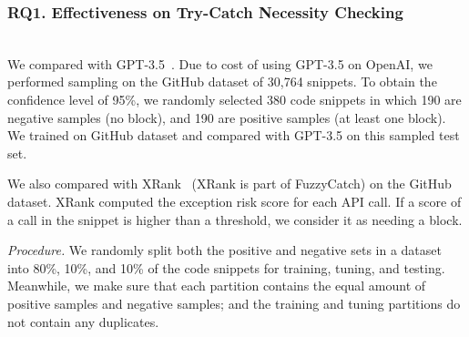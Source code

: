 \subsubsection{RQ1. Effectiveness on Try-Catch Necessity Checking}~\\
 We compared {\xblock} with
GPT-3.5~\cite{ChatGPT}. Due to cost of using GPT-3.5 on OpenAI, we
performed sampling on the GitHub dataset of 30,764 snippets. To obtain
the confidence level of 95\%, we randomly selected 380 code snippets
in which 190 are negative samples (no  block), and 190
are positive samples (at least one  block). We trained
on GitHub dataset and compared with GPT-3.5 on this sampled test set.

We also compared {\xblock} with XRank~\cite{xrank-fse20} (XRank is
part of FuzzyCatch) on the GitHub dataset. XRank computed
the exception risk score for each API call. If a score of a call in
the snippet is higher than a threshold, we consider it as needing a
 block.

{\em Procedure.} We randomly split both the positive and negative sets
in a dataset into 80\%, 10\%, and 10\% of the code
snippets for training, tuning, and testing. Meanwhile, we make sure
that each partition contains the equal amount of positive samples and
negative samples; and the training and tuning partitions do not
contain any duplicates.


